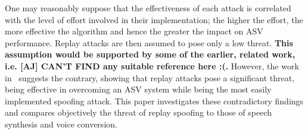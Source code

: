 One may reasonably suppose that the effectiveness of each attack is correlated with the level of effort involved in their implementation; the higher the effort, the more effective the algorithm and hence the greater the impact on ASV performance.  Replay attacks are then assumed to pose only a low threat.  {\bfseries This assumption would be supported by some of the earlier, related work, i.e. [AJ] CAN'T FIND any suitable reference here :(.}  However, the work in~\cite{Wu2014,Alegre2014} suggests the contrary, showing that replay attacks pose a significant threat, being effective in overcoming an ASV system while being the most easily implemented spoofing attack.  This paper investigates these contradictory findings and compares objectively the threat of replay spoofing to those of speech synthesis and voice conversion.
